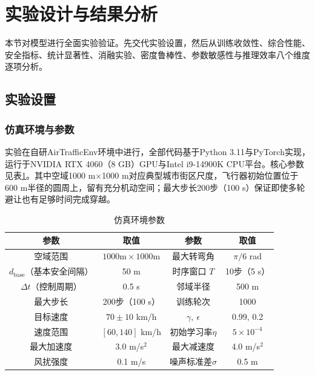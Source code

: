 \documentclass[12pt,a4paper,UTF8]{ctexart}
\begin{document}
\section{实验设计与结果分析}

本节对模型进行全面实验验证。先交代实验设置，然后从训练收敛性、综合性能、安全指标、统计显著性、消融实验、密度鲁棒性、参数敏感性与推理效率八个维度逐项分析。

\subsection{实验设置}

\subsubsection{仿真环境与参数}

实验在自研AirTrafficEnv环境中进行，全部代码基于Python 3.11与PyTorch实现，运行于NVIDIA RTX 4060（8 GB）GPU与Intel i9-14900K CPU平台。核心参数见表\ref{tab:env}。其中空域1000 m×1000 m对应典型城市街区尺度，飞行器初始位置位于600 m半径的圆周上，留有充分机动空间；最大步长200步（100 s）保证即使多轮避让也有足够时间完成穿越。

\begin{table}[H]
    \centering\small
    \caption{仿真环境参数}
    \label{tab:env}
    \begin{tabular}{|c|c|c|c|}
        \hline
        \textbf{参数} & \textbf{取值} & \textbf{参数} & \textbf{取值} \\
        \hline
        空域范围 & $1000\text{m}\times1000\text{m}$ & 最大转弯角 & $\pi/6$ rad \\
        $d_{\text{base}}$（基本安全间隔） & 50 m & 时序窗口 $T$ & 10步（5 s） \\
        $\Delta t$（控制周期） & 0.5 s & 邻域半径 & 500 m \\
        最大步长 & 200步（100 s） & 训练轮次 & 1000 \\
        目标速度 & $70\pm10$ km/h & $\gamma,\ \epsilon$ & 0.99, 0.2 \\
        速度范围 & $[60, 140]$ km/h & 初始学习率$\eta$ & $5\times10^{-4}$ \\
        最大加速度 & 3.0 m/s$^2$ & 最大减速度 & 4.0 m/s$^2$ \\
        风扰强度 & 0.1 m/s & 噪声标准差$\sigma$ & 0.5 m \\
        \hline
    \end{tabular}
\end{table}
\end{document}
